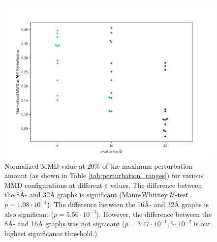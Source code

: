 \begin{figure}
  \centering
  \includegraphics[width=\textwidth]{./figures/results/swarmplot_2_1.pdf}
  \caption[Normalized MMD value at 20\% of the maximum perturbation amount for
various MMD configurations at different $\varepsilon$ values.]{Normalized MMD
value at 20\% of the maximum perturbation amount (as shown in Table
\ref{tab:perturbation_ranges}) for various MMD configurations at different
$\varepsilon$ values. The difference between the 8\si{\angstrom}- and
32\si{\angstrom} graphs is significant (Mann-Whitney $\mathcal{U}$-test
$p=1.08\cdot 10^{-4}$). The difference between the 16\si{\angstrom}- and
32\si{\angstrom} graphs is also significant ($p=5.56\cdot 10^{-3}$). However,
the difference between the 8\si{\angstrom}- and 16\si{\angstrom} graphs was not
signicant ($p=3.47\cdot 10^{-1}, 5\cdot 10^{-2}$ is our highest significance
threshold.)}
  \label{fig:difference_sensitivity_20_percent}
\end{figure}

\clearpage





